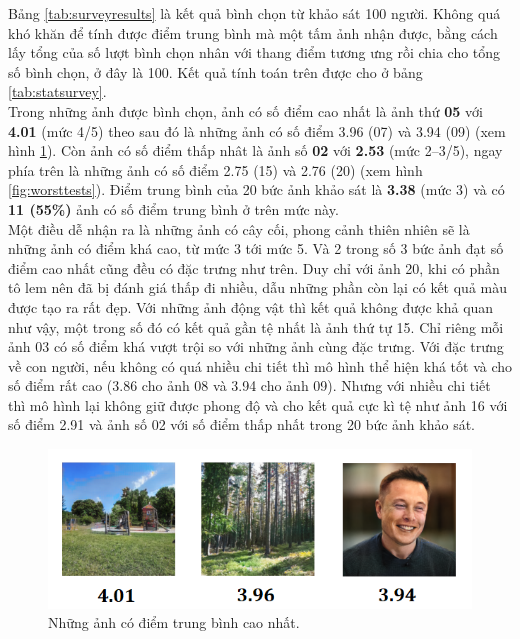 \documentclass[a4paper, 12pt]{article}
\begin{document}
\noindent
Bảng \ref{tab:surveyresults} là kết quả bình chọn từ khảo sát 100 người. Không quá khó khăn để tính được điểm trung bình mà một tấm ảnh nhận được, bằng cách lấy tổng của số lượt bình chọn nhân với thang điểm tương ưng rồi chia cho tổng số bình chọn, ở đây là 100. Kết quả tính toán trên được cho ở bảng \ref{tab:statsurvey}.\vspace{5pt}\\
Trong những ảnh được bình chọn, ảnh có số điểm cao nhất là ảnh thứ \textbf{05} với \textbf{4.01} (mức 4/5) theo sau đó là những ảnh có số điểm 3.96 (07) và 3.94 (09) (xem hình \ref{fig:besttests}). Còn ảnh có số điểm thấp nhât là ảnh số \textbf{02} với \textbf{2.53} (mức 2--3/5), ngay phía trên là những ảnh có số điểm 2.75 (15) và 2.76 (20) (xem hình \ref{fig:worsttests}). Điểm trung bình của 20 bức ảnh khảo sát là \textbf{3.38} (mức 3) và có \textbf{11 (55\%)} ảnh có số điểm trung bình ở trên mức này.\vspace{5pt}\\
Một điều dễ nhận ra là những ảnh có cây cối, phong cảnh thiên nhiên sẽ là những ảnh có điểm khá cao, từ mức 3 tới mức 5. Và 2 trong số 3 bức ảnh đạt số điểm cao nhất cũng đều có đặc trưng như trên. Duy chỉ với ảnh 20, khi có phần tô lem nên đã bị đánh giá thấp đi nhiều, dẫu những phần còn lại có kết quả màu được tạo ra rất đẹp. Với những ảnh động vật thì kết quả không được khả quan như vậy, một trong số đó có kết quả gần tệ nhất là ảnh thứ tự 15. Chỉ riêng mỗi ảnh 03 có số điểm khá vượt trội so với những ảnh cùng đặc trưng. Với đặc trưng về con người, nếu không có quá nhiều chi tiết thì mô hình thể hiện khá tốt và cho số điểm rất cao (3.86 cho ảnh 08 và 3.94 cho ảnh 09). Nhưng với nhiều chi tiết thì mô hình lại không giữ được phong độ và cho kết quả cực kì tệ như ảnh 16 với số điểm 2.91 và ảnh số 02 với số điểm thấp nhất trong 20 bức ảnh khảo sát.

\begin{figure}[!h]
\captionsetup{width=0.8\textwidth}
\centering
\includegraphics[width=12cm]{images/best.PNG}
\caption{Những ảnh có điểm trung bình cao nhất.}
\label{fig:besttests}
\end{figure}
\end{document}
